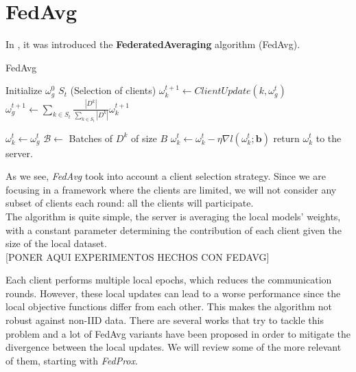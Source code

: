 \section{FedAvg}
In \cite*{mcmahan2023a}, it was introduced the \textbf{FederatedAveraging} algorithm (FedAvg).


\begin{algorithm}[H]
  \label{alg:FedAvg}
  \caption{FedAvg}
  \begin{algorithmic}[1]
    \Statex
    \State Initialize $\omega_g^0$
      \State $S_t$  (Selection of clients)
        \State $\omega_k^{t+1} \gets ClientUpdate(k, \omega_g^t)$
      \EndFor
      \State $\omega_g^{t+1} \gets \sum_{k \in S_t} \frac{|D^k|}{\sum_{k \in S_t} |D^k|} \omega_k^{t+1}$
    \EndFor
    \EndProcedure

    \State $\omega_k^t \gets \omega_g^t$
    \State $\mathcal{B} \gets$ Batches of $D^k$ of size $B$
        \State $\omega_k^t \gets \omega_k^t - \eta \nabla l(\omega_k^t; \mathbf{b})$
      \EndFor
    \EndFor
    \State return $\omega_k^t$ to the server.
    \EndProcedure
  \end{algorithmic}
\end{algorithm}

As we see, \textit{FedAvg} took into account a client selection strategy. Since we are focusing in a framework where the clients are limited, we will not consider any subset of clients each round: all the clients will participate.\\
The algorithm is quite simple, the server is averaging the local models' weights, with a constant parameter determining the contribution of each client given the size of the local dataset.\\

[PONER AQUI EXPERIMENTOS HECHOS CON FEDAVG]

Each client performs multiple local epochs, which reduces the communication rounds. However, these local updates can lead to a worse performance since the local objective functions differ from each other. This makes the algorithm not robust against non-IID data. There are several works that try to tackle this problem and a lot of FedAvg variants have been proposed in order to mitigate the divergence between the local updates. We will review some of the more relevant of them, starting with \textit{FedProx}.

